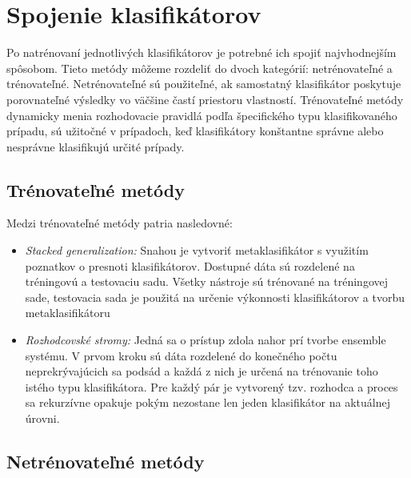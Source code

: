 \section{Spojenie klasifikátorov}

Po natrénovaní jednotlivých klasifikátorov je potrebné ich spojiť najvhodnejším spôsobom. Tieto metódy môžeme rozdeliť do dvoch kategórií: netrénovateľné a trénovateľné. Netrénovateľné sú použiteľné, ak samostatný klasifikátor poskytuje porovnateľné výsledky vo väčšine častí priestoru vlastností. Trénovateľné metódy dynamicky menia rozhodovacie pravidlá podľa špecifického typu klasifikovaného prípadu, sú užitočné v prípadoch, keď klasifikátory konštantne správne alebo nesprávne klasifikujú určité prípady.

\subsection{Trénovateľné metódy}
Medzi trénovateľné metódy patria nasledovné:
\begin{itemize}
	\item \textit{Stacked generalization:} Snahou je vytvoriť metaklasifikátor s využitím poznatkov o presnoti klasifikátorov. Dostupné dáta sú rozdelené na tréningovú a testovaciu sadu. Všetky nástroje sú trénované na tréningovej sade, testovacia sada je použitá na určenie výkonnosti klasifikátorov a tvorbu metaklasifikátoru
	\item \textit{Rozhodcovské stromy:} Jedná sa o prístup zdola nahor prí tvorbe ensemble systému. V prvom kroku sú dáta rozdelené do konečného počtu neprekrývajúcich sa podsád a každá z nich je určená na trénovanie toho istého typu klasifikátora. Pre každý pár je vytvorený tzv. rozhodca a proces sa rekurzívne opakuje pokým nezostane len jeden klasifikátor na aktuálnej úrovni. 
\end{itemize}

\subsection{Netrénovateľné metódy}

